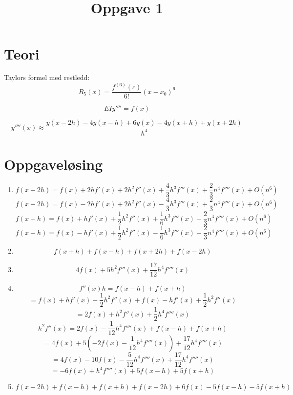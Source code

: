 \documentclass[11pt]{article}
\title{Oppgave 1}
\begin{document}
        \section{Teori}
        Taylors formel med restledd:
        \[R_5(x)= \frac{f^{(6)}(c)} {6!}(x-x_0)^6\]
        
        \[
        EIy''''=f(x)
        \]
        
        \[
            y''''(x) \approx \frac{y(x - 2h)-4y(x - h)+ 6y(x) - 4y(x + h) + y(x + 2h)}{h^4}
        \]

        \section{Oppgaveløsing}

    \begin{enumerate}
        \item \[f(x + 2h) = f(x) + 2hf'(x) + 2h^2f''(x) + \frac{4}{3}h^3f'''(x)+ \frac{2}{3}n^4f''''(x) +O(n^6)\]
         \[f(x - 2h) = f(x) - 2hf'(x) + 2h^2f''(x) - \frac{4}{3}h^3f'''(x)+ \frac{2}{3}n^4f''''(x) +O(n^6)\]
         \[f(x + h) = f(x) + hf'(x) + \frac{1}{2}h^2f''(x) + \frac{1}{6}h^3f'''(x)+ \frac{2}{3}n^4f''''(x) +O(n^6)\]
         \[f(x - h) = f(x) - hf'(x) + \frac{1}{2}h^2f''(x) - \frac{1}{6}h^3f'''(x)+ \frac{2}{3}n^4f''''(x) +O(n^6)\]
        \item \[f(x + h) + f(x - h) + f(x + 2h) + f(x - 2h)\]
        \item \[4f(x) + 5h^2f'''(x) + \frac{17}{12}h^4f''''(x)\]
        \item \[f''(x)h = f(x - h) + f(x + h)\]
        \[= f(x) + hf'(x) + \frac{1}{2}h^2f''(x) + f(x) - hf'(x) + \frac{1}{2}h^2f''(x)\]
        \[= 2f(x) + h^2f''(x) + \frac{1}{2}h^4f''''(x)\]
        \[h^2f''(x) = 2f(x) - \frac{1}{12}h^4f''''(x) + f(x - h) + f(x + h)\]
        \[= 4f(x) + 5(-2f(x)-\frac{1}{12} h^4f''''(x)) + \frac{17}{12}h^4f''''(x)\]
        \[= 4f(x) - 10f(x) - \frac{5}{12}h^4f''''(x) + \frac{17}{12}h^4f''''(x)\]
        \[= -6f(x) + h^4f''''(x) + 5f(x - h) + 5f(x + h)\]
        \item \[f(x - 2h) + f(x - h) + f(x + h) + f(x + 2h) + 6f(x) - 5f(x - h) - 5f(x + h)\]
        

    \end{enumerate}
        

        

        
\end{document}
